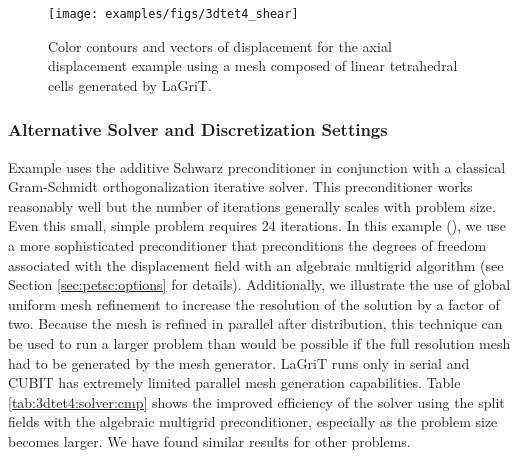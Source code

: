 \begin{figure}
  \texttt{[image: examples/figs/3dtet4\_shear]}
  \caption{Color contours and vectors of displacement for the axial displacement
    example using a mesh composed of linear tetrahedral cells generated
    by LaGriT.}
  \label{fig:3dtet4:shear}
\end{figure}


\subsubsection{Alternative Solver and Discretization Settings}

Example  uses the additive Schwarz preconditioner
in conjunction with a classical Gram-Schmidt orthogonalization iterative
solver. This preconditioner works reasonably well but the number of
iterations generally scales with problem size. Even this small, simple
problem requires 24 iterations. In this example (),
we use a more sophisticated preconditioner that preconditions the
degrees of freedom associated with the displacement field with an
algebraic multigrid algorithm (see Section \vref{sec:petsc:options}
for details). Additionally, we illustrate the use of global uniform
mesh refinement to increase the resolution of the solution by a factor
of two. Because the mesh is refined in parallel after distribution,
this technique can be used to run a larger problem than would be possible
if the full resolution mesh had to be generated by the mesh generator.
LaGriT runs only in serial and CUBIT has extremely limited parallel
mesh generation capabilities. Table \vref{tab:3dtet4:solver:cmp} shows
the improved efficiency of the solver using the split fields with
the algebraic multigrid preconditioner, especially as the problem
size becomes larger. We have found similar results for other problems.

